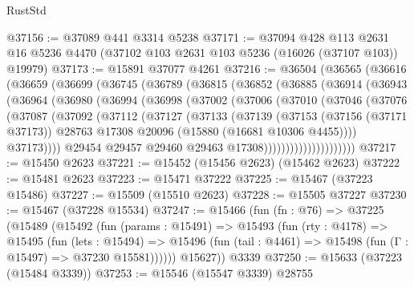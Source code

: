 \begin{lexlean}{RustStd}
\begin{coremodule}
@37156 := @37089 @441 @3314 @5238
@37171 := @37094
    @428
    @113
    @2631
    @16
    @5236
    @4470
    (@37102 @103 @2631 @103 @5236 (@16026 (@37107 @103)) @19979)
@37173 := @15891 @37077 @4261
@37216 := @36504
    (@36565
      (@36616
        (@36659
          (@36699
            (@36745
              (@36789
                (@36815
                  (@36852
                    (@36885
                      (@36914
                        (@36943
                          (@36964
                            (@36980
                              (@36994
                                (@36998
                                  (@37002
                                    (@37006
                                      (@37010
                                        (@37046
                                          (@37076
                                            (@37087
                                              (@37092
                                                (@37112
                                                  (@37127
                                                    (@37133
                                                      (@37139
                                                        (@37153
                                                          (@37156 (@37171 @37173))
                                                          @28763
                                                          @17308
                                                          @20096
                                                          (@15880 (@16681 @10306 @4455))))
                                                      @37173))))
                                              @29454
                                              @29457
                                              @29460
                                              @29463
                                              @17308)))))))))))))))))))))
@37217 := @15450 @2623
@37221 := @15452 (@15456 @2623) (@15462 @2623)
@37222 := @15481 @2623
@37223 := @15471 @37222
@37225 := @15467 (@37223 @15486)
@37227 := @15509 (@15510 @2623)
@37228 := @15505 @37227
@37230 := @15467 (@37228 @15534)
@37247 := @15466
    (fun (fn : @76) =>
    @37225
      (@15489
        (@15492
          (fun (params : @15491) =>
          @15493
            (fun (rty : @4178) =>
            @15495
              (fun (lets : @15494) =>
              @15496 (fun (tail : @4461) => @15498 (fun (Γ : @15497) => @37230 @15581))))))
        @15627))
    @3339
@37250 := @15633 (@37223 (@15484 @3339))
@37253 := @15546 (@15547 @3339) @28755

\end{coremodule}
\end{lexlean}
